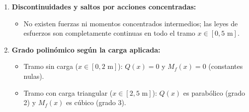 {\begin{enumerate}
\begin{itemize}
              \end{itemize}



        \item \textbf{Discontinuidades y saltos por acciones concentradas:}

              \begin{itemize}

                  \item No existen fuerzas ni momentos concentrados intermedios; las leyes de esfuerzos son completamente continuas en todo el tramo $x \in [0, 5\text{ m}]$.

              \end{itemize}



        \item \textbf{Grado polinómico según la carga aplicada:}

              \begin{itemize}

                  \item Tramo sin carga ($x \in [0, 2\text{ m}]$): $Q(x) = 0$ y $M_f(x) = 0$ (constantes nulas).

                  \item Tramo con carga triangular ($x \in [2, 5\text{ m}]$): $Q(x)$ es parabólico (grado 2) y $M_f(x)$ es cúbico (grado 3).

              \end{itemize}

    \end{enumerate}

}



